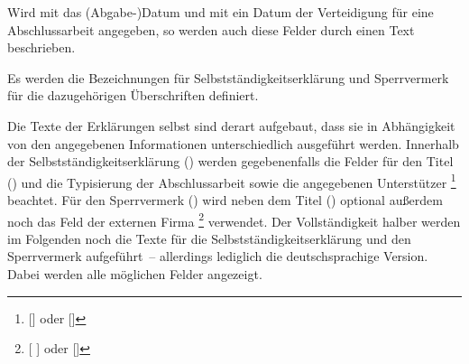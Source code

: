 \begin{Declaration*}{}
\begin{Declaration*}{}
\begin{Declaration*}{}
\begin{Declaration}{}
\begin{Declaration}{}
\printdeclarationlist%
%
%
%
%
%
Wird mit  das (Abgabe-)Datum und mit  ein Datum 
der Verteidigung für eine Abschlussarbeit angegeben, so 
werden auch diese Felder durch einen Text beschrieben.
%
\end{Declaration}
\end{Declaration}

\begin{Declaration}{}
\begin{Declaration}[v2.02]{}
\printdeclarationlist%
%
%
%
Es werden die Bezeichnungen für Selbstständigkeitserklärung und Sperrvermerk 
für die dazugehörigen Überschriften definiert.
\end{Declaration}
\end{Declaration}

\begin{Declaration}{}
\begin{Declaration}[v2.02]{}
\printdeclarationlist%
%
Die Texte der Erklärungen selbst sind derart aufgebaut, dass sie in 
Abhängigkeit von den angegebenen Informationen unterschiedlich ausgeführt 
werden. Innerhalb der Selbstständigkeitserklärung () werden 
gegebenenfalls die Felder für den Titel () und die Typisierung der 
Abschlussarbeit sowie die angegebenen Unterstützer%
\footnote{%
  []
  oder []%
}
beachtet. Für den Sperrvermerk () wird neben dem Titel 
() optional außerdem noch das Feld der externen Firma%
\footnote{%
  [%
  ]
  oder []%
}
verwendet. Der Vollständigkeit halber werden im Folgenden noch die Texte für 
die Selbstständigkeitserklärung und den Sperrvermerk aufgeführt~-- allerdings 
lediglich die deutschsprachige Version. Dabei werden alle möglichen Felder 
angezeigt.


\end{Declaration}
\end{Declaration}
\end{Declaration*}
\end{Declaration*}
\end{Declaration*}

